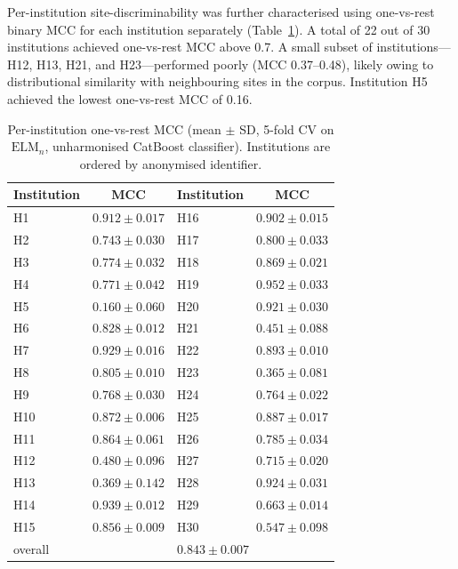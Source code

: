 \documentclass[preprint,12pt]{elsarticle}
\begin{document}
Per-institution site-discriminability was further characterised
using one-vs-rest binary MCC for each institution separately
(Table~\ref{tab:per_site_mcc}).
A total of 22 out of 30 institutions achieved one-vs-rest MCC
above 0.7.
A small subset of institutions---H12, H13, H21, and
H23---performed poorly (MCC 0.37--0.48), likely owing to
distributional similarity with neighbouring sites in the corpus.
Institution H5 achieved the lowest one-vs-rest MCC of 0.16.

\begin{table}[htbp]
  \centering
  \caption{Per-institution one-vs-rest MCC (mean $\pm$ SD, 5-fold CV
    on $\mathrm{ELM}_n$, unharmonised CatBoost classifier).
    Institutions are ordered by anonymised identifier.}
  \label{tab:per_site_mcc}
  \begin{tabular}{lc@{\quad}lc}
    \toprule
    \textbf{Institution} & \textbf{MCC} &
    \textbf{Institution} & \textbf{MCC} \\
    \midrule
    H1  & $0.912 \pm 0.017$ & H16 & $0.902 \pm 0.015$ \\
    H2  & $0.743 \pm 0.030$ & H17 & $0.800 \pm 0.033$ \\
    H3  & $0.774 \pm 0.032$ & H18 & $0.869 \pm 0.021$ \\
    H4  & $0.771 \pm 0.042$ & H19 & $0.952 \pm 0.033$ \\
    H5  & $0.160 \pm 0.060$ & H20 & $0.921 \pm 0.030$ \\
    H6  & $0.828 \pm 0.012$ & H21 & $0.451 \pm 0.088$ \\
    H7  & $0.929 \pm 0.016$ & H22 & $0.893 \pm 0.010$ \\
    H8  & $0.805 \pm 0.010$ & H23 & $0.365 \pm 0.081$ \\
    H9  & $0.768 \pm 0.030$ & H24 & $0.764 \pm 0.022$ \\
    H10 & $0.872 \pm 0.006$ & H25 & $0.887 \pm 0.017$ \\
    H11 & $0.864 \pm 0.061$ & H26 & $0.785 \pm 0.034$ \\
    H12 & $0.480 \pm 0.096$ & H27 & $0.715 \pm 0.020$ \\
    H13 & $0.369 \pm 0.142$ & H28 & $0.924 \pm 0.031$ \\
    H14 & $0.939 \pm 0.012$ & H29 & $0.663 \pm 0.014$ \\
    H15 & $0.856 \pm 0.009$ & H30 & $0.547 \pm 0.098$ \\
    \midrule
    \multicolumn{2}{l}{overall} &
    \multicolumn{2}{l}{$0.843 \pm 0.007$} \\
    \bottomrule
  \end{tabular}
\end{table}
\end{document}
